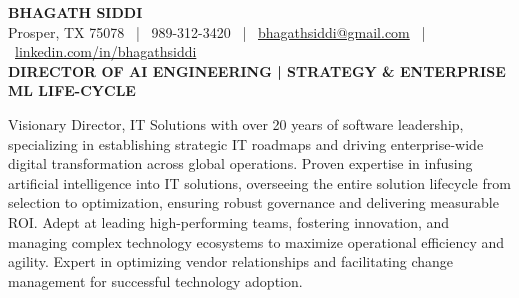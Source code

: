 \documentclass[9pt, letterpaper]{extarticle}
\begin{document}
\begin{center}
    {\huge \textbf{BHAGATH SIDDI}} \\
    \vspace{1pt}
    \small Prosper, TX 75078 \ | \ 989-312-3420 \ | \ \href{mailto:bhagathsiddi@gmail.com}{bhagathsiddi@gmail.com} \ | \ \href{https://www.linkedin.com/in/bhagathsiddi}{linkedin.com/in/bhagathsiddi} \\
    \vspace{2pt} 
    \textbf{\large DIRECTOR OF AI ENGINEERING | STRATEGY \& ENTERPRISE ML LIFE-CYCLE}
\end{center}

\vspace{-6pt}
{
\small \centering
Visionary Director, IT Solutions with over 20 years of software leadership, specializing in establishing strategic IT roadmaps and driving enterprise-wide digital transformation across global operations. Proven expertise in infusing artificial intelligence into IT solutions, overseeing the entire solution lifecycle from selection to optimization, ensuring robust governance and delivering measurable ROI. Adept at leading high-performing teams, fostering innovation, and managing complex technology ecosystems to maximize operational efficiency and agility. Expert in optimizing vendor relationships and facilitating change management for successful technology adoption.
\par}

\vspace{-6pt}

\end{document}
